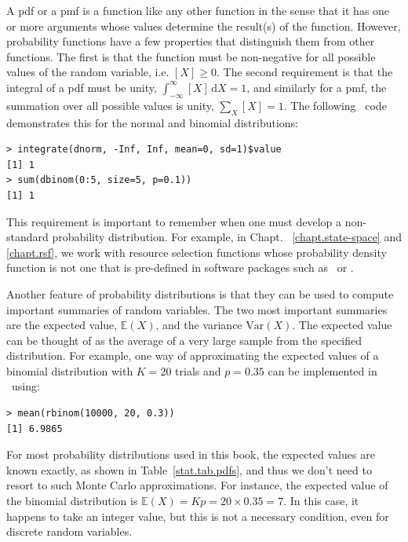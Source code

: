 A pdf or a pmf is a function like any other function
in the sense that it has one or more arguments whose values determine
the result(s) of the function. However, probability functions have a few
properties that distinguish them from other functions.
The first is that the function
must be non-negative for all possible values of the random variable,
i.e. $[X] \geq 0$. The second requirement is that the integral of
a pdf must be unity, $\int_{-\infty}^{\infty} [X]\, \text{d}{X} = 1$, and similarly
for a pmf, the summation over all possible values is unity, $\sum_X [X]
= 1$. The following \R~code demonstrates
this for the normal and binomial distributions:
\begin{samepage}
\begin{verbatim}
> integrate(dnorm, -Inf, Inf, mean=0, sd=1)$value
[1] 1
> sum(dbinom(0:5, size=5, p=0.1))
[1] 1
\end{verbatim}
\end{samepage}
This requirement is important to remember when one must develop a
non-standard probability distribution. For example, in Chapt.
~\ref{chapt.state-space} and \ref{chapt.rsf},
we work with resource selection functions whose probability
density function is not one that is pre-defined in software packages
such as \R~or \bugs.

Another feature of probability distributions is that they can be used
to compute important summaries of random variables. The two most
important summaries are the expected value, $\mathbb{E}(X)$,
and the variance $\text{Var}(X)$. The expected value
can be thought of as the average
of a very large sample from the specified distribution. For
example, %
one way of approximating the expected values of a binomial
distribution with $K=20$ trials and $p=0.35$ can be implemented in \R~using:
\begin{verbatim}
> mean(rbinom(10000, 20, 0.3))
[1] 6.9865
\end{verbatim}
For most probability distributions used in this book, the expected
values are known exactly, as shown in Table~\ref{stat.tab.pdfs}, and
thus we don't need to resort to such Monte Carlo approximations. For instance, the
expected value of the binomial distribution is $\mathbb{E}(X) = Kp =
20 \times 0.35 = 7$. In this case, it happens to take an integer
value, but this is not a necessary condition, even for discrete random
variables.

